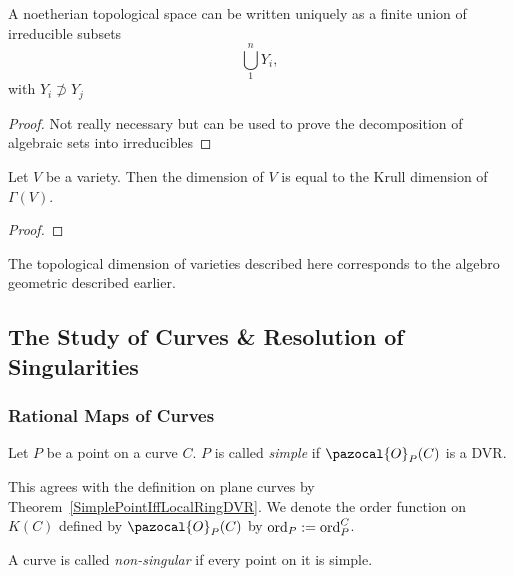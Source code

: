     \begin{proposition}
        A noetherian topological space can be written uniquely as a finite union of irreducible subsets 
        $$
            \bigcup_1^n Y_i,
        $$
        with $Y_i\not\supset Y_j$
    \end{proposition}
    \begin{proof}
        {\Large Not really necessary but can be used to prove the decomposition of algebraic sets into irreducibles}
    \end{proof}
    \begin{theorem}
        Let $V$ be a variety. Then the dimension of $V$ is equal to the Krull dimension of $\Gamma(V)$.
    \end{theorem}
    \begin{proof}
        
    \end{proof}
    \begin{corollary}
        The topological dimension of varieties described here corresponds to the algebro geometric described earlier. 
    \end{corollary}
\subsection{The Study of Curves \& Resolution of Singularities}
    \subsubsection{Rational Maps of Curves}
        \begin{definition}
            Let $P$ be a point on a curve $C$. $P$ is called \textit{simple} if $\pazocal{O}_P(C)$ is a DVR. 
        \end{definition}
        \begin{remark}
            This agrees with the definition on plane curves by Theorem~\ref{SimplePointIffLocalRingDVR}. We denote the order function on $K(C)$ defined by $\pazocal{O}_P(C)$ by $\mathrm{ord}_P:=\mathrm{ord}_P^C$. 
        \end{remark}
        \begin{definition}
            A curve is called \textit{non-singular} if every point on it is simple.
        \end{definition}
       
